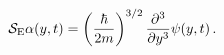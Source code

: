 \begin{equation}
{\cal S}_\mathrm{E} \alpha(y,t) = 
 \left(\frac{\hbar}{2m}\right)^{3/2} \frac{\partial^3}{\partial y^3}
 \psi(y,t) \, .
\label{eq21}
\end{equation}

